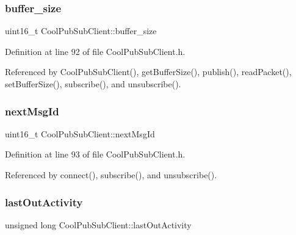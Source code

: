 \subsubsection{\texorpdfstring{buffer\+\_\+size}{buffer\_size}}
{\footnotesize\ttfamily uint16\+\_\+t Cool\+Pub\+Sub\+Client\+::buffer\+\_\+size\hspace{0.3cm}{\ttfamily [private]}}



Definition at line 92 of file Cool\+Pub\+Sub\+Client.\+h.



Referenced by Cool\+Pub\+Sub\+Client(), get\+Buffer\+Size(), publish(), read\+Packet(), set\+Buffer\+Size(), subscribe(), and unsubscribe().

\mbox{\label{class_cool_pub_sub_client_af248fa4e54e878e2fece2891eb98d262}} 
\subsubsection{\texorpdfstring{next\+Msg\+Id}{nextMsgId}}
{\footnotesize\ttfamily uint16\+\_\+t Cool\+Pub\+Sub\+Client\+::next\+Msg\+Id\hspace{0.3cm}{\ttfamily [private]}}



Definition at line 93 of file Cool\+Pub\+Sub\+Client.\+h.



Referenced by connect(), subscribe(), and unsubscribe().

\mbox{\label{class_cool_pub_sub_client_a8930f17c8a384f2e7600b5b854d67506}} 
\subsubsection{\texorpdfstring{last\+Out\+Activity}{lastOutActivity}}
{\footnotesize\ttfamily unsigned long Cool\+Pub\+Sub\+Client\+::last\+Out\+Activity\hspace{0.3cm}{\ttfamily [private]}}



